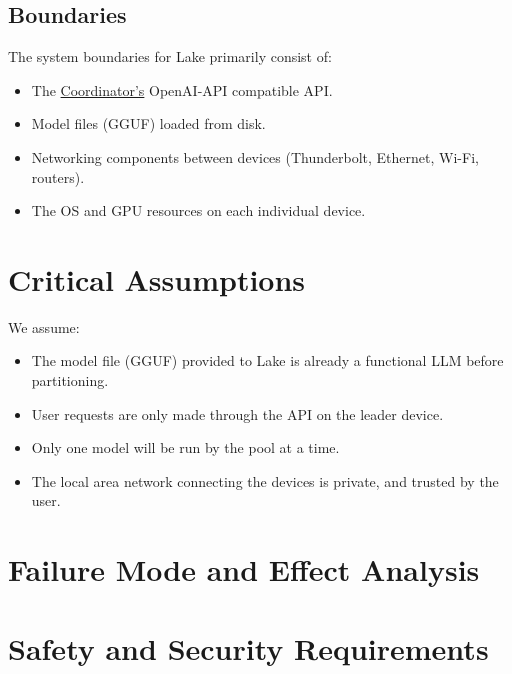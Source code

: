 \documentclass{article}
\begin{document}
\subsection{Boundaries}
The system boundaries for Lake primarily consist of:
\begin{itemize}
	\item The \hyperref[subsec:coordinator]{Coordinator's} OpenAI-API compatible API.
	\item Model files (GGUF) loaded from disk.
	\item Networking components between devices (Thunderbolt, Ethernet, Wi-Fi, routers).
	\item The OS and GPU resources on each individual device.
\end{itemize}

\section{Critical Assumptions}

We assume:
\begin{itemize}
	\item The model file (GGUF) provided to Lake is already a functional LLM before partitioning.
	\item User requests are only made through the API on the leader device.
	\item Only one model will be run by the pool at a time.
	\item The local area network connecting the devices is private, and trusted by the user.
\end{itemize}

\section{Failure Mode and Effect Analysis}


\section{Safety and Security Requirements}
\end{document}
